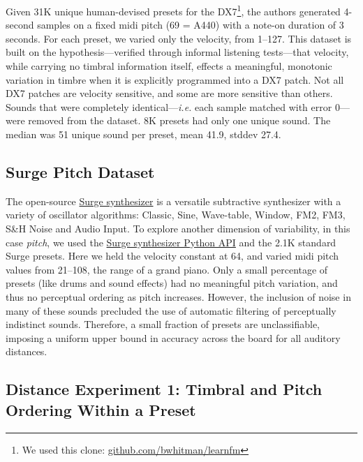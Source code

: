 Given 31K unique human-devised presets for the DX7\footnote{We used this clone: \url{github.com/bwhitman/learnfm}}, the authors generated 4-second samples on a fixed midi pitch (69 = A440) with a note-on duration of 3 seconds. For each preset, we varied only the velocity, from 1--127. This dataset is built on the hypothesis---verified through informal listening tests---that velocity, while carrying no timbral information itself, effects a meaningful, monotonic variation in timbre when it is explicitly programmed into a DX7 patch. Not all DX7 patches are velocity sensitive, and some are more sensitive than others. Sounds that were completely identical---{\em i.e.} each sample matched with error 0---were removed from the dataset. 8K presets had only one unique sound. The median was 51 unique sound per preset, mean 41.9, stddev 27.4.

\subsection{Surge Pitch Dataset}
\label{sec:surge}

The open-source \href{https://surge-synthesizer.github.io/}{Surge synthesizer} is a versatile subtractive synthesizer with a variety of oscillator algorithms: Classic, Sine, Wave-table, Window, FM2, FM3, S\&H Noise and Audio Input. To explore another dimension of variability, in this case {\em pitch}, we used the \href{https://github.com/surge-synthesizer/surge-python}{Surge synthesizer Python API} and the 2.1K standard Surge presets. Here we held the velocity constant at 64, and varied midi pitch values from 21--108, the range of a grand piano. Only a small percentage of presets (like drums and sound effects) had no meaningful pitch variation, and thus no perceptual ordering as pitch increases. However, the inclusion of noise in many of these sounds precluded the use of automatic filtering of perceptually indistinct sounds. Therefore, a small fraction of presets are unclassifiable, imposing a uniform upper bound in accuracy across the board for all auditory distances.

\subsection{Distance Experiment 1: Timbral and Pitch Ordering Within a Preset}
\label{sec:experiment1}

